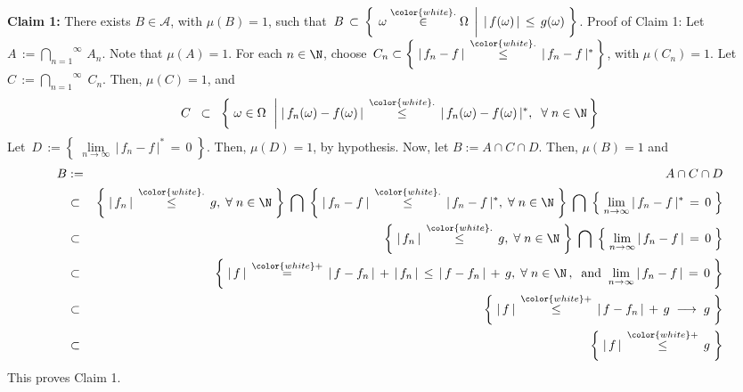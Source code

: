 \vskip 0.3cm
\noindent
\textbf{Claim 1:}\quad
There exists $B \in \mathcal{A}$, with $\mu(B)=1$, such that\,
$B \,\subset\, \left\{\;\left.\omega\overset{{\color{white}.}}{\in}\Omega\,\;\right\vert\;\vert\,f(\omega)\,\vert\,\leq\,g(\omega)\;\right\}$.
\vskip 0.1cm
\noindent
Proof of Claim 1:\;\;
Let \;$A \,:= \overset{\infty}{\underset{n=1}{\bigcap}}\,A_{n}$.
Note that $\mu(A) = 1$.
For each $n\in\N$, choose
\,$C_{n} \subset \left\{\;\vert\,f_{n} - f\,\vert \,\overset{{\color{white}.}}{\leq}\, \vert\,f_{n} - f\,\vert^{*}\,\right\}$,
with $\mu(C_{n}) = 1$. Let $C \,:= \overset{\infty}{\underset{n=1}{\bigcap}}\;C_{n}$. Then, $\mu(C) = 1$, and
\begin{equation*}
C \;\;\subset\;\;
	\left\{\;
	\omega \in \Omega
	\;\,\left\vert\;
	\vert\,f_{n}(\omega) - f(\omega)\,\vert \,\overset{{\color{white}.}}{\leq}\, \vert\,f_{n}(\omega) - f(\omega)\,\vert^{*},
	\right.
	\;\forall\;n\in\N
	\,\right\}
\end{equation*}
Let \,$D \,:= \left\{\;\underset{n\rightarrow\infty}{\lim}\,\vert\,f_{n} - f\,\vert^{*}\,=\,0\;\right\}$.
Then, $\mu(D) = 1$, by hypothesis.
Now, let $B := A \cap C \cap D$. Then, $\mu(B) = 1$ and 
\begin{eqnarray*}
B
&:=&
	A \cap C \cap D
\\
& \subset &
	\left\{\;\vert\,f_{n}\,\vert \,\overset{{\color{white}.}}{\leq}\, g,\;\forall\;n\in\N\;\right\}
	\;\bigcap\;
	\left\{\;\vert\,f_{n} - f\,\vert \,\overset{{\color{white}.}}{\leq}\, \vert\,f_{n} - f\,\vert^{*},\;\forall\;n\in\N\;\right\}
	\;\bigcap\;
	\left\{\;\underset{n\rightarrow\infty}{\lim}\,\vert\,f_{n} - f\,\vert^{*}\,=\,0\;\right\}
\\
& \subset &
	\left\{\;\vert\,f_{n}\,\vert \,\overset{{\color{white}.}}{\leq}\, g,\;\forall\;n\in\N\;\right\}
	\;\bigcap\;
	\left\{\;\underset{n\rightarrow\infty}{\lim}\,\vert\,f_{n} - f\,\vert\,=\,0\;\right\}
\\
& \subset &
	\left\{\;
		\vert\,f\,\vert
		\,\overset{{\color{white}+}}{=}\,
		\vert\,f - f_{n}\,\vert\,+\,\vert\,f_{n}\,\vert
		\,\leq\,
		\vert\,f - f_{n}\,\vert\,+\,g,
		\;\forall\;n\in\N\,,
		\;\;\textnormal{and}\;\;
		\underset{n\rightarrow\infty}{\lim}\,\vert\,f_{n} - f\,\vert\,=\,0
	\;\right\}
\\
& \subset &
	\left\{\;
		\vert\,f\,\vert
		\,\overset{{\color{white}+}}{\leq}\,
		\vert\,f - f_{n}\,\vert\,+\,g
		\;\longrightarrow\;
		g
	\;\right\}
\\
& \subset &
	\left\{\;
		\vert\,f\,\vert
		\,\overset{{\color{white}+}}{\leq}\,
		g
	\;\right\}
\end{eqnarray*}
This proves Claim 1.

